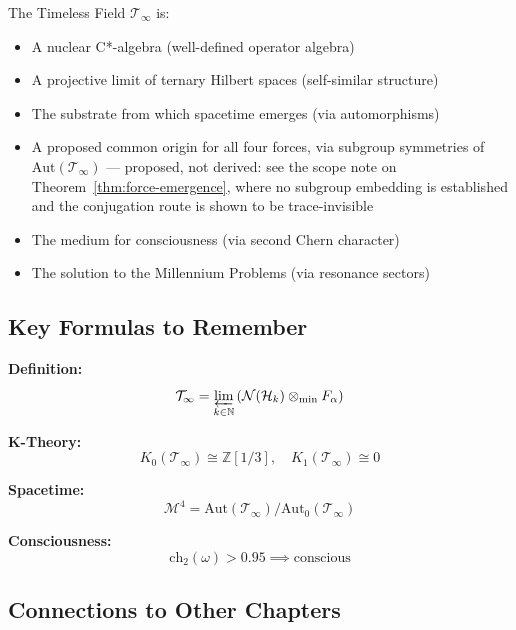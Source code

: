 The Timeless Field $\mathcal{T}_\infty$ is:
\begin{itemize}
\item A nuclear C*-algebra (well-defined operator algebra)
\item A projective limit of ternary Hilbert spaces (self-similar structure)
\item The substrate from which spacetime emerges (via automorphisms)
\item A proposed common origin for all four forces, via subgroup
  symmetries of $\mathrm{Aut}(\mathcal{T}_\infty)$ --- proposed, not
  derived: see the scope note on Theorem~\ref{thm:force-emergence}, where
  no subgroup embedding is established and the conjugation route is shown
  to be trace-invisible
\item The medium for consciousness (via second Chern character)
\item The solution to the Millennium Problems (via resonance sectors)
\end{itemize}

\subsection{Key Formulas to Remember}

\begin{tcolorbox}[colback=yellow!10!white, colframe=orange!75!black, title=Essential Formulas]
\textbf{Definition:}
\begin{equation*}
\mathcal{T}_\infty = \varprojlim_{k \in \mathbb{N}} \left(\mathcal{N}(\mathcal{H}_k) \otimes_{\min} F_\alpha\right)
\end{equation*}

\textbf{K-Theory:}
\begin{equation*}
K_0(\mathcal{T}_\infty) \cong \mathbb{Z}[1/3], \quad K_1(\mathcal{T}_\infty) \cong 0
\end{equation*}

\textbf{Spacetime:}
\begin{equation*}
\mathcal{M}^4 = \text{Aut}(\mathcal{T}_\infty) / \text{Aut}_0(\mathcal{T}_\infty)
\end{equation*}

\textbf{Consciousness:}
\begin{equation*}
\text{ch}_2(\omega) > 0.95 \implies \text{conscious}
\end{equation*}
\end{tcolorbox}

\subsection{Connections to Other Chapters}

